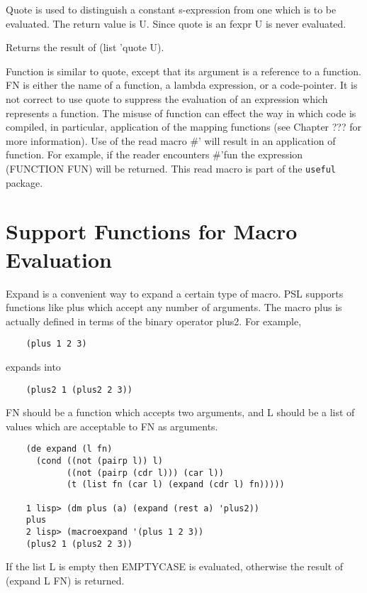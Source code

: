 {    Quote  is  used  to distinguish a constant s-expression from
    one which is to be evaluated.  The return value is U.  Since
    quote is an fexpr U is never evaluated.  }

{    Returns the result of (list 'quote U).  }

{    Function is similar to quote, except that its argument is a
    reference to a function. FN is either the name of a
    function, a lambda expression, or a code-pointer. It is not
    correct to use  quote  to  suppress  the  evaluation  of  an
    expression  which  represents  a  function. The misuse of
    function can effect the way in which code is compiled, in
    particular, application of the mapping functions  (see
    Chapter ??? for more information).
}
    Use of the read macro \#' will result in  an  application  of
    function.  For example, if the reader encounters  \#'fun  the
    expression (FUNCTION FUN) will be returned. This read macro
    is part of the {\tt useful} package.

\section{Support Functions for Macro Evaluation}

{    Expand is a convenient way  to  expand  a  certain  type  of
    macro.   PSL  supports  functions like plus which accept any
    number of arguments.  The macro plus is actually defined  in
    terms of the binary operator plus2.  For example,
}
\begin{verbatim}
    (plus 1 2 3)
\end{verbatim}
    expands into

\begin{verbatim}
    (plus2 1 (plus2 2 3))
\end{verbatim}
    FN  should  be a function which accepts two arguments, and L
    should be a list of values which are  acceptable  to  FN  as
    arguments.

\begin{verbatim}
    (de expand (l fn)
      (cond ((not (pairp l)) l)
            ((not (pairp (cdr l))) (car l))
            (t (list fn (car l) (expand (cdr l) fn)))))

    1 lisp> (dm plus (a) (expand (rest a) 'plus2))
    plus
    2 lisp> (macroexpand '(plus 1 2 3))
    (plus2 1 (plus2 2 3))
\end{verbatim}

{    If the list L is empty then EMPTYCASE is evaluated,
    otherwise the result of (expand L FN) is returned.
}
